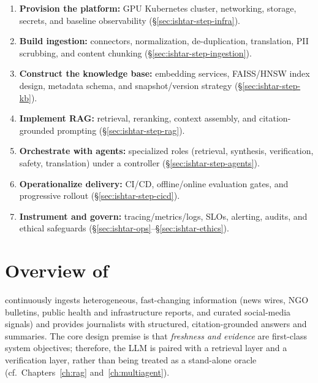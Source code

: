 \begin{tcolorbox}[
  title={\textbf{At a Glance: The End-to-End \ishtar{} Build}},
  colback=black!5,
  colframe=black!40!black,
  colbacktitle=black!20,
  coltitle=black,
  fonttitle=\bfseries,
  boxrule=0.7pt,
  arc=4pt,
  left=5mm, right=5mm, top=4mm, bottom=4mm,
  before skip=6pt,
  after skip=6pt,
  breakable
]
\small
\begin{enumerate}[leftmargin=*,label=\textbf{Step \arabic*:}]
    \item \textbf{Provision the platform:} GPU Kubernetes cluster, networking, storage, secrets, and baseline observability (\S\ref{sec:ishtar-step-infra}).
    \item \textbf{Build ingestion:} connectors, normalization, de-duplication, translation, PII scrubbing, and content chunking (\S\ref{sec:ishtar-step-ingestion}).
    \item \textbf{Construct the knowledge base:} embedding services, FAISS/HNSW index design, metadata schema, and snapshot/version strategy (\S\ref{sec:ishtar-step-kb}).
    \item \textbf{Implement RAG:} retrieval, reranking, context assembly, and citation-grounded prompting (\S\ref{sec:ishtar-step-rag}).
    \item \textbf{Orchestrate with agents:} specialized roles (retrieval, synthesis, verification, safety, translation) under a controller (\S\ref{sec:ishtar-step-agents}).
    \item \textbf{Operationalize delivery:} CI/CD, offline/online evaluation gates, and progressive rollout (\S\ref{sec:ishtar-step-cicd}).
    \item \textbf{Instrument and govern:} tracing/metrics/logs, SLOs, alerting, audits, and ethical safeguards (\S\ref{sec:ishtar-ops}--\S\ref{sec:ishtar-ethics}).
\end{enumerate}
\end{tcolorbox}

\section{Overview of \ishtar{}}
\label{sec:ishtar-overview}

\ishtar{} continuously ingests heterogeneous, fast-changing information (news wires, NGO bulletins, public health and infrastructure reports, and curated social-media signals) and provides journalists with structured, citation-grounded answers and summaries.
The core design premise is that \emph{freshness and evidence} are first-class system objectives; therefore, the LLM is paired with a retrieval layer and a verification layer, rather than being treated as a stand-alone oracle (cf.\ Chapters~\ref{ch:rag} and~\ref{ch:multiagent}).

